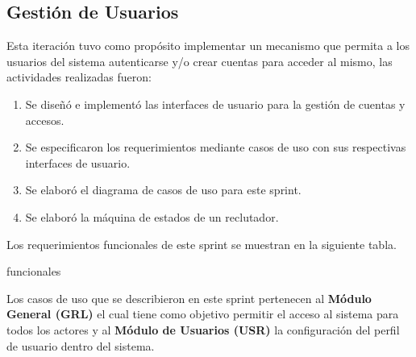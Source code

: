 \subsection{Gestión de Usuarios}

    Esta iteración tuvo como propósito implementar un mecanismo que permita a los usuarios del sistema autenticarse y/o crear cuentas
    para acceder al mismo, las actividades realizadas fueron:
    \begin{enumerate}
        \item Se diseñó e implementó las interfaces de usuario para la gestión de cuentas y accesos.
        \item Se especificaron los requerimientos mediante casos de uso con sus respectivas interfaces de usuario.
        \item Se elaboró el diagrama de casos de uso para este sprint.
        \item Se elaboró la máquina de estados de un reclutador.
    \end{enumerate} 

    Los requerimientos funcionales de este sprint se muestran en la siguiente tabla.
    \begin{requerimientos}{funcionales}
    \end{requerimientos}

    Los casos de uso que se describieron en este sprint pertenecen al \textbf{Módulo General (GRL)} el cual tiene como objetivo 
    permitir el acceso al sistema para todos los actores y al \textbf{Módulo de Usuarios (USR)} la configuración del perfil de usuario dentro del sistema.

